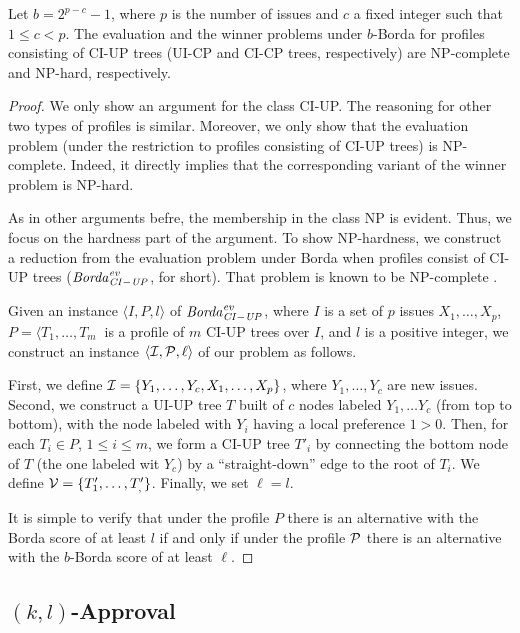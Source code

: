 \begin{thm}
\label{thm6}
Let $b=2^{p-c}-1$, where $p$ is the number of issues and $c$ a fixed
integer such that $1\leq c <p$. The evaluation
and the winner problems under $b$-Borda for profiles consisting of
CI-UP trees (UI-CP and CI-CP trees, respectively) are NP-complete 
and NP-hard, respectively.
\end{thm}
\begin{proof}
We only show an argument for the class CI-UP. The reasoning for other 
two types of profiles is similar. Moreover, we only show that the evaluation
problem (under the restriction to profiles consisting of CI-UP trees) is
NP-complete. Indeed, it directly implies that the corresponding variant of
the winner problem is NP-hard.
 
As in other arguments befre, the membership in the class NP is evident.
Thus, we focus on the hardness part of the argument. To show NP-hardness,
we construct a reduction from the evaluation problem under Borda when
profiles consist of CI-UP trees ($\mathit{Borda}^{\mathit{ev}}_{\mathit{CI-UP}}$, for short). That problem is 
known to be NP-complete \cite{lang:aggLP}.

Given an instance $\langle I, P, l \rangle$ of $\mathit{Borda}^{\mathit{ev}}_{\mathit{CI-UP}}$, where $I$ is a set 
of $p$ issues $X_1,\ldots, X_p$, $P=\langle T_1,\ldots, T_m\>$ is a profile
of $m$ CI-UP trees over $I$, and $l$ is a positive integer, we construct an 
instance $\langle \mathcal{I}, \mathcal{P},\ell\rangle$ of our problem as follows.

First, we define $\mathcal{I} = \{Y_1,\ldots, Y_c,X_1,\ldots,X_p \}$, where 
$Y_1, \ldots, Y_c$ are new issues. Second, we construct a UI-UP tree $T$ 
built of $c$ nodes labeled $Y_1, \ldots Y_c$ (from top to bottom), with the 
node labeled with $Y_i$ having a local preference $1 > 0$. Then, for each  
$T_i \in P$, $1 \leq i \leq m$, we form a CI-UP tree $T'_i$ by connecting
the bottom node of $T$ (the one labeled wit $Y_c$) by a ``straight-down''
edge to the root of $T_i$. We define $\mathcal{V} = \{ T_1',\ldots,T_,' \}$. 
Finally, we set $\ell=l$.

It is simple to verify that under the profile $P$ there is an alternative 
with the Borda score of at least $l$ if and only if under the profile
$\mathcal{P}$ there is an alternative with the $b$-Borda score of at least $\ell$. 
\end{proof}

\subsection{$(k,l)$-Approval}

